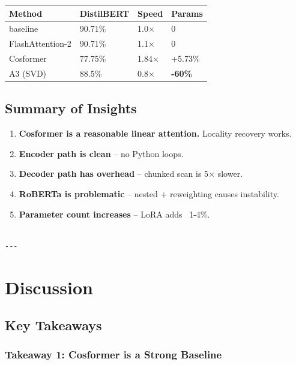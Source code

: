 \begin{table}[H]
\centering
\small
\begin{tabular}{llll}
\toprule
\textbf{Method} & \textbf{DistilBERT} & \textbf{Speed} & \textbf{Params} \\
\midrule
baseline & 90.71\% & 1.0$\times$ & 0 \\
FlashAttention-2 & 90.71\% & 1.1$\times$ & 0 \\
Cosformer & 77.75\% & 1.84$\times$ & +5.73\% \\
A3 (SVD) & 88.5\% & 0.8$\times$ & \textbf{-60\%} \\
\bottomrule
\end{tabular}
\end{table}

\subsection{Summary of Insights}

\begin{enumerate}
\item \textbf{Cosformer is a reasonable linear attention.} Locality recovery works.
\item \textbf{Encoder path is clean} -- no Python loops.
\item \textbf{Decoder path has overhead} -- chunked scan is 5$\times$ slower.
\item \textbf{RoBERTa is problematic} -- nested + reweighting causes instability.
\item \textbf{Parameter count increases} -- LoRA adds ~1-4\%.
\end{enumerate}
\begin{lstlisting}

---
\end{lstlisting}


\section{Discussion}

\subsection{Key Takeaways}

\subsubsection{Takeaway 1: Cosformer is a Strong Baseline}

